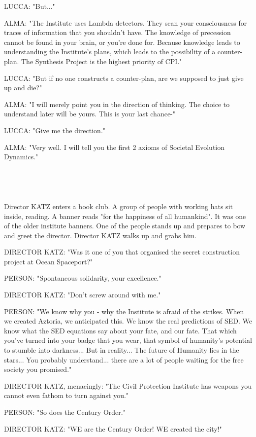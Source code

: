 \documentclass[11pt]{article}
\begin{document}
LUCCA: "But..."

ALMA: "The Institute uses Lambda detectors. 
They scan your consciousness for traces of information that you shouldn't have. 
The knowledge of precession cannot be found in your brain, or you're done for.
Because knowledge leads to understanding the Institute's plans, which leads to the possibility of a counter-plan.
The Synthesis Project is the highest priority of CPI."

LUCCA: "But if no one constructs a counter-plan, are we supposed to just give up and die?"

ALMA: "I will merely point you in the direction of thinking. 
The choice to understand later will be yours.
This is your last chance-"

LUCCA: "Give me the direction."

ALMA: "Very well. 
I will tell you the first 2 axioms of Societal Evolution Dynamics."



\ 

\ 

Director KATZ enters a book club.
A group of people with working hats sit inside, reading.
A banner reads "for the happiness of all humankind". 
It was one of the older institute banners.
One of the people stands up and prepares to bow and greet the director.
Director KATZ walks up and grabs him.

DIRECTOR KATZ: "Was it one of you that organised the secret construction project at Ocean Spaceport?"

PERSON: "Spontaneous solidarity, your excellence."

DIRECTOR KATZ: "Don't screw around with me."

PERSON: "We know why you - why the Institute is afraid of the strikes.
When we created Aztoria, we anticipated this. 
We know the real predictions of SED.
We know what the SED equations say about your fate, and our fate.
That which you've turned into your badge that you wear, that symbol of humanity's potential to stumble into darkness...
But in reality... The future of Humanity lies in the stars...
You probably understand... there are a lot of people waiting for the free society you promised."

DIRECTOR KATZ, menacingly: "The Civil Protection Institute has weapons you cannot even fathom to turn against you."

PERSON: "So does the Century Order."

DIRECTOR KATZ: "WE are the Century Order! 
WE created the city!"
\end{document}
